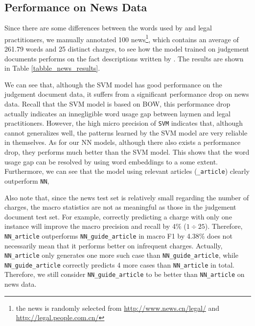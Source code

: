 \subsection{Performance on News Data}
Since there are some differences between the words used by  and legal practitioners, 
we manually annotated 100 news\footnote{the news is randomly selected from \url{http://www.news.cn/legal/} and \url{http://legal.people.com.cn/}}, 
which contains an average of 261.79 words and 25 distinct charges, to see how the model trained on judgement documents performs on the fact descriptions written by . The results are shown in Table \ref{tabble_news_results}.

We can see that, although the SVM model has good performance on the judgement document data, it suffers from a significant performance drop on news data.
Recall that the SVM model is based on BOW, this performance drop actually indicates an innegligible word usage gap between laymen and legal practitioners. 
However, the high micro precision of \texttt{SVM} indicates that, although cannot generalizes well, the patterns learned by the SVM model are very reliable in themselves.
As for our NN models, although there also exists a performance drop, they performs much better than the SVM model. This shows that the word usage gap can be resolved by using word embeddings to a some extent. Furthermore, we can see that the model using relevant articles (\texttt{\_article}) clearly outperform \texttt{NN}, 

Also note that, since the news test set is relatively small regarding the number of charges, the macro statistics are not as meaningful as those in the judgement document test set. For example, correctly predicting a charge with only one instance will improve the macro precision and recall by 4\% (${1}\div{25}$). Therefore, \texttt{NN\_article} outperforms \texttt{NN\_guide\_article} in macro F1 by 4.38\% does not necessarily mean that it performs better on infrequent charges. 
Actually, %
\texttt{NN\_article} only generates one more such case than \texttt{NN\_guide\_article}, while \texttt{NN\_guide\_article} correctly predicts 4 more cases than \texttt{NN\_article} in total. Therefore, we still consider \texttt{NN\_guide\_article} to be better than \texttt{NN\_article} on news data.


